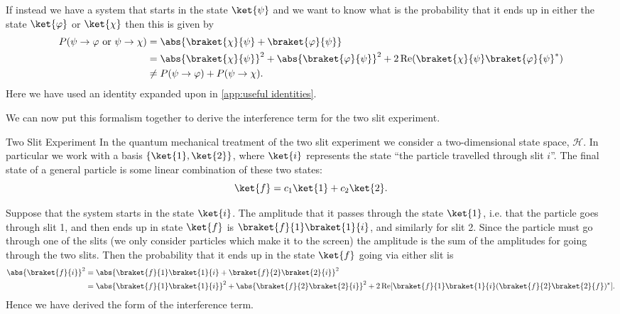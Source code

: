 \documentclass[fleqn]{NotesClass}
\newcommand*{\hilbert}{\mathcal{H}}
\DeclareMathOperator{\Re}{Re}
\begin{document}
    If instead we have a system that starts in the state \(\ket{\psi}\) and we want to know what is the probability that it ends up in either the state \(\ket{\varphi}\) or \(\ket{\chi}\) then this is given by
    \begin{align}
        P(\psi \to \varphi \text{ or }\psi \to \chi) &= \abs{\braket{\chi}{\psi} + \braket{\varphi}{\psi}}\\
        &= \abs{\braket{\chi}{\psi}}^2 + \abs{\braket{\varphi}{\psi}}^2 + 2\Re(\braket{\chi}{\psi}\braket{\varphi}{\psi}^*)\\
        &\ne P(\psi \to \varphi) + P(\psi \to \chi).
    \end{align}
    Here we have used an identity expanded upon in \cref{app:useful identities}.
    
    
    We can now put this formalism together to derive the interference term for the two slit experiment.
    \begin{exm}{Two Slit Experiment}{}
        In the quantum mechanical treatment of the two slit experiment we consider a two-dimensional state space, \(\hilbert\).
        In particular we work with a basis \(\{\ket{1}, \ket{2}\}\), where \(\ket{i}\) represents the state \enquote{the particle travelled through slit \(i\)}.
        The final state of a general particle is some linear combination of these two states:
        \begin{equation}
            \ket{f} = c_1\ket{1} + c_2\ket{2}.
        \end{equation}
        
        Suppose that the system starts in the state \(\ket{i}\).
        The amplitude that it passes through the state \(\ket{1}\), i.e. that the particle goes through slit 1, and then ends up in state \(\ket{f}\) is \(\braket{f}{1}\braket{1}{i}\), and similarly for slit 2.
        Since the particle must go through one of the slits (we only consider particles which make it to the screen) the amplitude is the sum of the amplitudes for going through the two slits.
        Then the probability that it ends up in the state \(\ket{f}\) going via either slit is
        \begin{align}
            \abs{\braket{f}{i}}^2 &= \abs{\braket{f}{1}\braket{1}{i} + \braket{f}{2}\braket{2}{i}}^2\\
            &= \abs{\braket{f}{1}\braket{1}{i}}^2 + \abs{\braket{f}{2}\braket{2}{i}}^2 + 2\Re[\braket{f}{1}\braket{1}{i}(\braket{f}{2}\braket{2}{f})^*].
        \end{align}
        Hence we have derived the form of the interference term.
    \end{exm}
\end{document}
